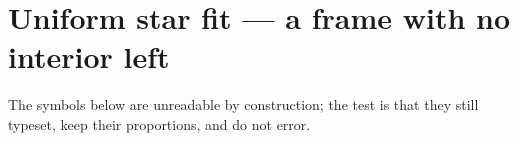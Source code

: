 \documentclass{jlreq}
\begin{document}
\section*{Uniform star fit --- a frame with no interior left}

\KKSfitbasesuite

\noindent The symbols below are unreadable by construction; the test is that
they still typeset, keep their proportions, and do not error.\par
\medskip
{}\par
{}
\end{document}
